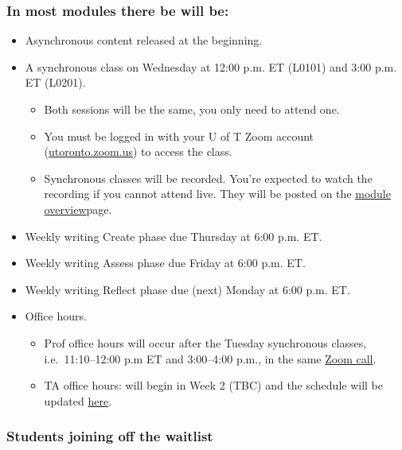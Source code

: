 \documentclass[
  openany]{book}
\begin{document}
\hypertarget{in-most-modules-there-be-will-be}{%
\subsubsection{\texorpdfstring{\textbf{In most modules there be will be:}}{In most modules there be will be:}}\label{in-most-modules-there-be-will-be}}

\begin{itemize}
\item
  Asynchronous content released at the beginning.
\item
  A synchronous class on Wednesday at 12:00 p.m. ET (L0101) and 3:00 p.m. ET (L0201).

  \begin{itemize}
  \item
    Both sessions will be the same, you only need to attend one.
  \item
    You must be logged in with your U of T Zoom account (\href{https://utoronto.zoom.us}{utoronto.zoom.us}) to access the class.
  \item
    Synchronous classes will be recorded. You're expected to watch the recording if you cannot attend live. They will be posted on the \href{https://q.utoronto.ca/courses/204826/pages/course-overview}{module overview}page.
  \end{itemize}
\item
  Weekly writing Create phase due Thursday at 6:00 p.m. ET.
\item
  Weekly writing Assess phase due Friday at 6:00 p.m. ET.
\item
  Weekly writing Reflect phase due (next) Monday at 6:00 p.m. ET.
\item
  Office hours.

  \begin{itemize}
  \item
    Prof office hours will occur after the Tuesday synchronous classes, i.e.~11:10--12:00 p.m ET and 3:00--4:00 p.m., in the same \href{https://q.utoronto.ca/courses/204826/pages/join-synchronous-class}{Zoom call}.
  \item
    TA office hours: will begin in Week 2 (TBC) and the schedule will be updated \href{https://q.utoronto.ca/courses/204826/pages/office-hours}{here}.
  \end{itemize}
\end{itemize}

\hypertarget{students-joining-off-the-waitlist}{%
\subsubsection{Students joining off the waitlist}\label{students-joining-off-the-waitlist}}
\end{document}
